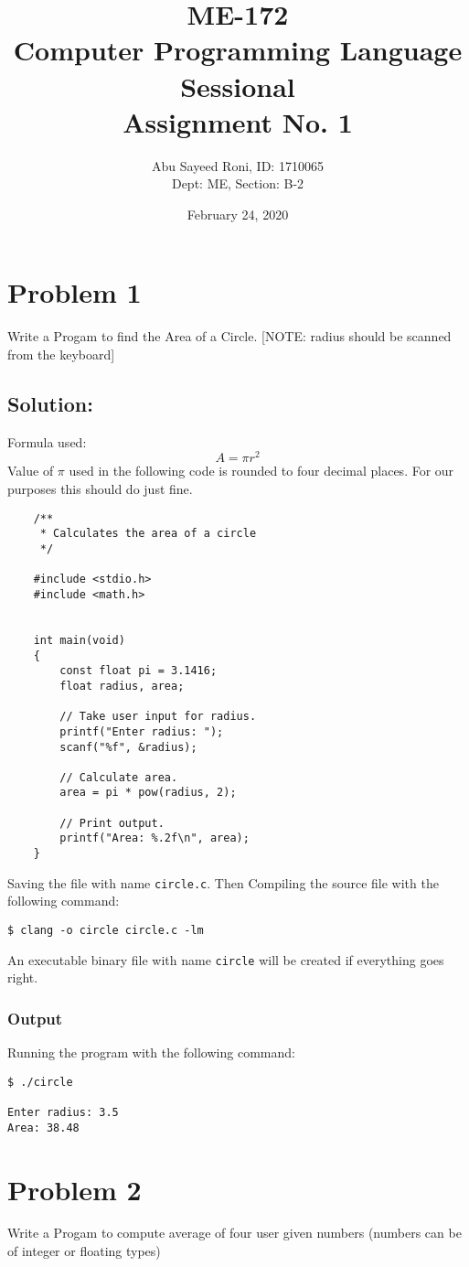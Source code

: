 \documentclass[12pt, letterpaper]{report}
\title{ME-172\\Computer Programming Language Sessional\\Assignment No. 1}
\author{Abu Sayeed Roni, ID: 1710065\\Dept: ME, Section: B-2}
\date{February 24, 2020}
\begin{document}
\maketitle

\section*{Problem 1}
{\large Write a Progam to find the Area of a Circle. [NOTE: radius should be scanned from the keyboard]}

\subsection*{Solution:}
Formula used: 
\begin{displaymath}
A = \pi r^2
\end{displaymath}
Value of $\pi$ used in the following code is rounded to four decimal places. For our purposes this should do just fine.
\begin{verbatim}
    /**
     * Calculates the area of a circle
     */

    #include <stdio.h>
    #include <math.h>


    int main(void)
    {
        const float pi = 3.1416;
        float radius, area;

        // Take user input for radius.
        printf("Enter radius: ");
        scanf("%f", &radius);

        // Calculate area.
        area = pi * pow(radius, 2);

        // Print output.
        printf("Area: %.2f\n", area);
    }
\end{verbatim}
Saving the file with name \texttt{circle.c}. Then Compiling the source file with the following command:

\begin{verbatim}
$ clang -o circle circle.c -lm
\end{verbatim}
An executable binary file with name \texttt{circle} will be created if everything goes right.
\subsubsection*{Output}
Running the program with the following command:
\begin{verbatim}
$ ./circle

Enter radius: 3.5
Area: 38.48
\end{verbatim}

\section*{Problem 2}
{\large Write a Progam to compute average of four user given numbers (numbers can be of integer or floating types)}
\end{document}
